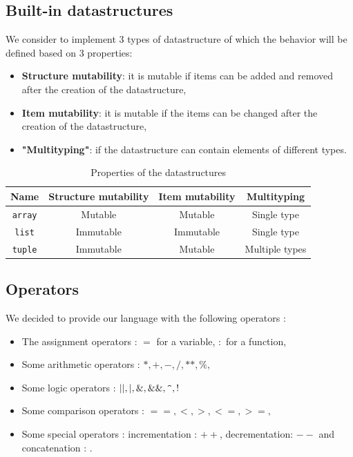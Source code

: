 \documentclass[a4paper,titlepage]{article}
\begin{document}
  \subsection{Built-in datastructures}

We consider to implement 3 types of datastructure of which the behavior will be defined based on 3 properties:
\begin{itemize}
  \item \textbf{Structure mutability}: it is mutable if items can be added and removed after the creation of the datastructure,
  \item \textbf{Item mutability}: it is mutable if the items can be changed after the creation of the datastructure,
  \item \textbf{"Multityping"}: if the datastructure can contain elements of different types. 
\end{itemize}

\begin{table}[h!]
  \center
  \begin{tabular}{c|ccc}
    Name & Structure mutability & Item mutability & Multityping\\
    \hline
    \texttt{array} & Mutable & Mutable & Single type\\
    \texttt{list} & Immutable & Immutable & Single type\\
    \texttt{tuple} & Immutable & Mutable & Multiple types
  \end{tabular}
  \caption{Properties of the datastructures}
\end{table}

  \subsection{Operators}
We decided to provide our language with the following operators :
\begin{itemize}
  \item The assignment operators : $ = $ for a variable, $ : $ for a function,
  \item Some arithmetic operators : $*, +, -, /, **, \%,$
  \item Some logic operators : $||, |, \&, \&\&, \verb+^+, !$
  \item Some comparison operators : $==, <, >, <=, >=,$
  \item Some special operators : incrementation : $++$, decrementation: $--$ and concatenation : $.$ 
\end{itemize}


\newpage
\end{document}
